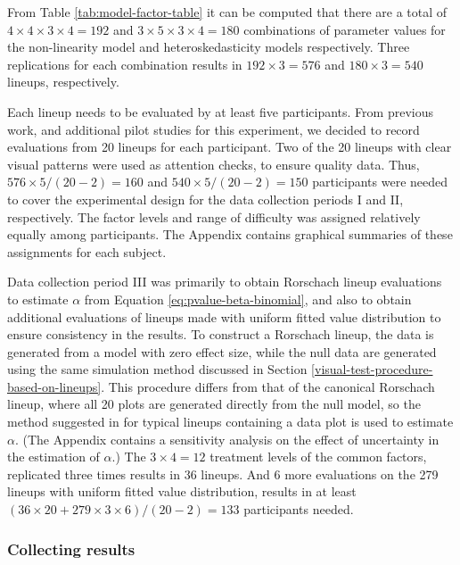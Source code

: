 \documentclass[]{interact}
\theoremstyle{plain}%
\theoremstyle{definition}
\theoremstyle{remark}
\begin{document}
From Table \ref{tab:model-factor-table} it can be computed that there
are a total of \(4 \times 4 \times 3 \times 4 = 192\) and
\(3 \times 5 \times 3 \times 4 = 180\) combinations of parameter values
for the non-linearity model and heteroskedasticity models respectively.
Three replications for each combination results in
\(192 \times 3 = 576\) and \(180 \times 3 = 540\) lineups, respectively.

Each lineup needs to be evaluated by at least five participants. From
previous work, and additional pilot studies for this experiment, we
decided to record evaluations from 20 lineups for each participant. Two
of the 20 lineups with clear visual patterns were used as attention
checks, to ensure quality data. Thus, \(576 \times 5 / (20-2) = 160\)
and \(540 \times 5 / (20-2) = 150\) participants were needed to cover
the experimental design for the data collection periods I and II,
respectively. The factor levels and range of difficulty was assigned
relatively equally among participants. The Appendix contains graphical
summaries of these assignments for each subject.

Data collection period III was primarily to obtain Rorschach lineup
evaluations to estimate \(\alpha\) from Equation
\ref{eq:pvalue-beta-binomial}, and also to obtain additional evaluations
of lineups made with uniform fitted value distribution to ensure
consistency in the results. To construct a Rorschach lineup, the data is
generated from a model with zero effect size, while the null data are
generated using the same simulation method discussed in Section
\ref{visual-test-procedure-based-on-lineups}. This procedure differs
from that of the canonical Rorschach lineup, where all 20 plots are
generated directly from the null model, so the method suggested in
\citet{vanderplas2021statistical} for typical lineups containing a data
plot is used to estimate \(\alpha\). (The Appendix contains a
sensitivity analysis on the effect of uncertainty in the estimation of
\(\alpha\).) The \(3 \times 4 = 12\) treatment levels of the common
factors, replicated three times results in 36 lineups. And 6 more
evaluations on the 279 lineups with uniform fitted value distribution,
results in at least
\((36 \times 20 + 279 \times 3 \times 6) / (20-2) = 133\) participants
needed.

\hypertarget{collecting-results}{%
\subsubsection{Collecting results}\label{collecting-results}}
\end{document}
